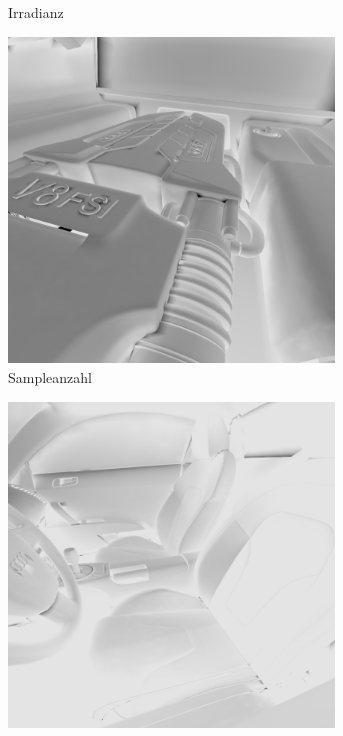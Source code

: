 \begin{figure}[h]
\begin{subfigure}[t]{0.5\textwidth}
				\caption{Irradianz}
			\end{subfigure}
			\begin{subfigure}[t]{0.5\textwidth}
				\center
				\includegraphics[width=0.95\textwidth]{pic/irr_est-ra-r8_3-scount.png}
				\caption{Sampleanzahl}
			\end{subfigure}
			\begin{subfigure}[t]{0.5\textwidth}
				\center
				\includegraphics[width=0.95\textwidth]{pic/irr_est-ra-r8_4-scount.png}

\end{subfigure}
\end{figure}
